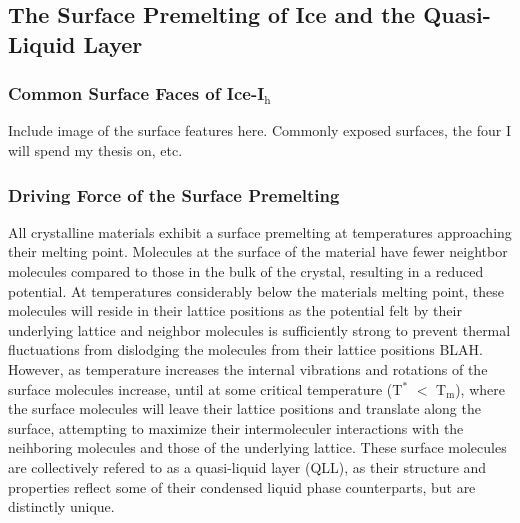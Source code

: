 \subsection{The Surface Premelting of Ice and the Quasi-Liquid Layer}

\subsubsection{Common Surface Faces of Ice-I$_\mathrm{h}$}
Include image of the surface features here. Commonly exposed surfaces,
the four I will spend my thesis on, etc.


\subsubsection{Driving Force of the Surface Premelting}
All crystalline materials exhibit a surface premelting at temperatures
approaching their melting point. Molecules at the surface of the
material have fewer neightbor molecules compared to those in the bulk
of the crystal, resulting in a reduced potential. At temperatures
considerably below the materials melting point, these molecules will
reside in their lattice positions as the potential felt by their
underlying lattice and neighbor molecules is sufficiently strong to
prevent thermal fluctuations from dislodging the molecules from their
lattice positions BLAH. However, as temperature increases the internal
vibrations and rotations of the surface molecules increase, until at
some critical temperature (T$^\mathrm{*}$ $<$ T$_\mathrm{m}$), where
the surface molecules will leave their lattice positions and translate
along the surface, attempting to maximize their intermoleculer
interactions with the neihboring molecules and those of the underlying
lattice. These surface molecules are collectively refered to as a
quasi-liquid layer (QLL), as their structure and properties reflect
some of their condensed liquid phase counterparts, but are distinctly
unique.

